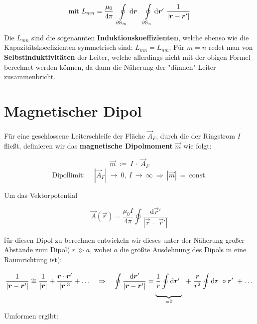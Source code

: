 \begin{equation*}
\text{mit } L_{mn} = \frac{\mu_0}{4\pi} \ \Oint{\partial\mathcal{S}_m}{}{\vec{r}}\ \Oint{\partial\mathcal{S}_n}{}{\vec{r}'}\frac{1}{|\vec{r}-\vec{r}'|}
\end{equation*}

Die $L_{mn}$ sind die sogenannten \textbf{Induktionskoeffizienten}, welche ebenso wie die Kapazitätskoeefizienten symmetrisch sind: $L_{mn} = L_{nm}$. Für $m=n$ redet man von \textbf{Selbstinduktivitäten} der Leiter, welche allerdings  nicht mit der obigen Formel berechnet werden können, da dann die Näherung der "dünnen" Leiter zusammenbricht.

\section{Magnetischer Dipol}

Für eine geschlossene Leiterschleife der Fläche $\vec{A}_F$, durch die der Ringstrom $I$ fließt, definieren wir das \textbf{magnetische Dipolmoment} $\vec{m}$ wie folgt:

\begin{equation*}
\vec{m} \ := \ I \ \cdot \ \vec{A}_F
\end{equation*}
\begin{equation*}
\text{Dipollimit: } \quad |\vec{A}_F| \ \rightarrow \ 0, \ I \ \rightarrow \ \infty \ \Rightarrow \ |\vec{m}| \ = \ \text{const.}
\end{equation*}

Um das Vektorpotential

\begin{equation*}
\vec{A}(\vec{r}) = \frac{\mu_0 I}{4\pi}\oint\frac{\mathrm{d}\vec{r}'}{|\vec{r}-\vec{r}'|}
\end{equation*}

für diesen Dipol zu berechnen entwickeln wir dieses unter der Näherung großer Abstände zum Dipol( $r\gg a$, wobei $a$ die größte Ausdehnung des Dipols in eine Raumrichtung ist):

\begin{equation*}
\frac{1}{|\vec{r}-\vec{r}'|} \cong  \frac{1}{|\vec{r}|} + \frac{\vec{r}\cdot\vec{r}'}{|\vec{r}|^3} + \dotsc \quad \Rightarrow \quad \oint\frac{\mathrm{d}\vec{r}'}{|\vec{r}-\vec{r}'|} = \underbrace{\frac{1}{r} \Oint{}{}{\vec{r}'}}_{=0} \ + \ \frac{\vec{r}}{r^2}\Oint{}{}{\vec{r}} \circ\vec{r}' \ + \dotsc
\end{equation*}

Umformen ergibt:

